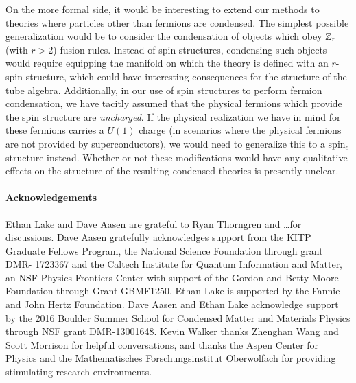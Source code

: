 On the more formal side, it would be interesting to extend our methods to theories where particles other than fermions are condensed. 
The simplest possible generalization would be to consider the condensation of objects which obey $\mathbb{Z}_r$ (with $r>2$) 
fusion rules. 
Instead of spin structures, condensing such objects would require equipping the manifold on which the theory is defined with an $r$-spin structure, 
which could have interesting consequences for the structure of the 
tube algebra.  
Additionally, in our use of spin structures %
to perform fermion condensation, we have tacitly assumed that the physical fermions which provide the spin structure are {\it uncharged}. 
If the physical realization we have in mind for these fermions carries a $U(1)$ charge (in scenarios where 
the physical fermions are not provided by superconductors), we would need to generalize this to a spin$_c$ structure instead. 
Whether or not these modifications would have any qualitative effects on the structure of the resulting condensed theories 
is presently unclear.  


 \paragraph{Acknowledgements}
Ethan Lake and Dave Aasen are grateful to Ryan Thorngren and \dots for discussions. Dave Aasen gratefully acknowledges support from the KITP Graduate Fellows Program, the National Science Foundation through grant DMR- 1723367
and the Caltech Institute for Quantum Information and Matter, 
an NSF Physics Frontiers Center with support of the Gordon and Betty Moore Foundation through Grant GBMF1250.
Ethan Lake is supported by the Fannie and John Hertz Foundation.
Dave Aasen and Ethan Lake acknowledge support by the 2016 Boulder Summer School for Condensed
Matter and Materials Physics through NSF grant DMR-13001648.
Kevin Walker thanks Zhenghan Wang and Scott Morrison for helpful conversations, and
thanks the Aspen Center for Physics and  the Mathematisches Forschungsinstitut Oberwolfach
for providing stimulating research environments.

